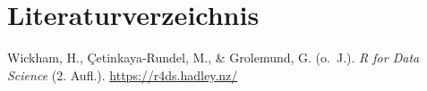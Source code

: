 \documentclass[
  letterpaper,
  DIV=11]{scrartcl}
\newlength{\cslhangindent}
\newlength{\cslentryspacingunit} %
\newenvironment{CSLReferences}[2] %
 {%
  \setlength{\parindent}{0pt}
  \ifodd #1
  \let\oldpar\par
  \def\par{\hangindent=\cslhangindent\oldpar}
  \fi
  \setlength{\parskip}{#2\cslentryspacingunit}
 }%
 {}
\begin{document}
\hypertarget{literaturverzeichnis}{%
\section*{Literaturverzeichnis}\label{literaturverzeichnis}}

\hypertarget{refs}{}
\begin{CSLReferences}{1}{0}
\leavevmode{}%
Wickham, H., Çetinkaya-Rundel, M., \& Grolemund, G. (o.~J.). \emph{R for
{Data Science}} (2. Aufl.). \url{https://r4ds.hadley.nz/}

\end{CSLReferences}
\end{document}
